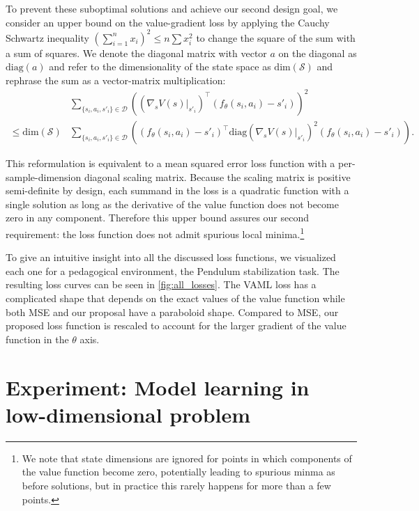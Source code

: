 To prevent these suboptimal solutions and achieve our second design goal, we consider an upper bound on the value-gradient loss by applying the Cauchy Schwartz inequality $\left(\sum_{i=1}^n x_i \right) ^2 \leq n \sum x_i^2$ to change the square of the sum with a sum of squares.
We denote the diagonal matrix with vector $a$ on the diagonal as $\text{diag}(a)$ and refer to the dimensionality of the state space as $\text{dim}(\mathcal{S})$ and rephrase the sum as a vector-matrix multiplication:
\begin{align}
    &\sum_{\{s_i,a_i,s'_i\}\in\mathcal{D}} {\left((\nabla_s V(s)|_{s'_i})^\intercal(f_\theta(s_i,a_i) - s'_i) \right)^2}\\
    \leq {\text{dim}(\mathcal{S})} &\sum_{\{s_i,a_i,s'_i\}\in\mathcal{D}}\left((f_\theta(s_i,a_i) - s'_i)^\intercal\text{diag}(\nabla_s V(s)|_{s'_i})^2(f_\theta(s_i,a_i) - s'_i) \right) \label{eq:upper_bound}.
\end{align}

This reformulation is equivalent to a mean squared error loss function with a per-sample-dimension diagonal scaling matrix.
Because the scaling matrix is positive semi-definite by design, each summand in the loss is a quadratic function with a single solution as long as the derivative of the value function does not become zero in any component.
Therefore this upper bound assures our second requirement: the loss function does not admit spurious local minima.\footnote{We note that state dimensions are ignored for points in which components of the value function become zero, potentially leading to spurious minma as before solutions, but in practice this rarely happens for more than a few points.}

To give an intuitive insight into all the discussed loss functions, we visualized each one for a pedagogical environment, the Pendulum stabilization task.
The resulting loss curves can be seen in \autoref{fig:all_losses}.
The VAML loss has a complicated shape that depends on the exact values of the value function while both MSE and our proposal have a paraboloid shape.
Compared to MSE, our proposed loss function is rescaled to account for the larger gradient of the value function in the $\theta$ axis.

\section{Experiment: Model learning in low-dimensional problem}
\label{sec:experiments}

